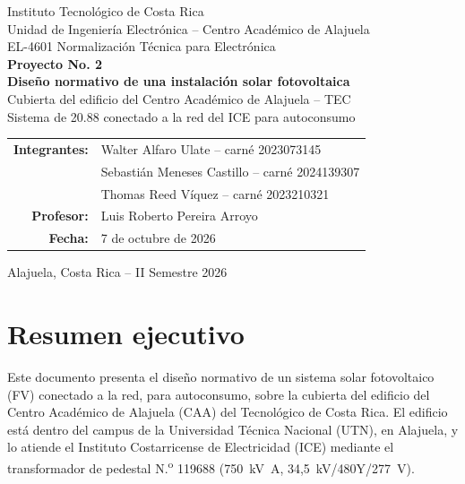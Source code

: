 \documentclass[12pt]{article}
\begin{document}
\begin{titlepage}
\centering
\vspace*{1.2cm}
{\Large Instituto Tecnológico de Costa Rica\\[0.3cm]}
{\large Unidad de Ingeniería Electrónica -- Centro Académico de Alajuela\\[1.0cm]}
{\large EL-4601 Normalización Técnica para Electrónica\\[0.5cm]}
{\LARGE\bfseries Proyecto No. 2\\[0.35cm]}
{\LARGE\bfseries Diseño normativo de una instalación solar fotovoltaica\\[0.2cm]}
{\Large Cubierta del edificio del Centro Académico de Alajuela -- TEC\\[0.2cm]}
{\large Sistema de \SI{20.88}{\kWp} conectado a la red del ICE para autoconsumo\\[1.5cm]}

\begin{tabular}{rl}
\textbf{Integrantes:} & Walter Alfaro Ulate -- carné 2023073145\\
& Sebastián Meneses Castillo -- carné 2024139307\\
& Thomas Reed Víquez -- carné 2023210321\\
\textbf{Profesor:} & Luis Roberto Pereira Arroyo\\
\textbf{Fecha:} & 7 de octubre de 2026\\
\end{tabular}

\vfill
{\small Alajuela, Costa Rica -- II Semestre 2026}
\end{titlepage}

\tableofcontents
\clearpage
\listoffigures
\listoftables
\clearpage

\section{Resumen ejecutivo}

Este documento presenta el diseño normativo de un sistema solar fotovoltaico (FV) conectado a la red, para autoconsumo, sobre la cubierta del edificio del Centro Académico de Alajuela (CAA) del Tecnológico de Costa Rica. El edificio está dentro del campus de la Universidad Técnica Nacional (UTN), en Alajuela, y lo atiende el Instituto Costarricense de Electricidad (ICE) mediante el transformador de pedestal N.\textsuperscript{o} 119688 (\SI{750}{\kilo\volt\ampere}, 34,5~kV/480Y/277~V).
\end{document}
